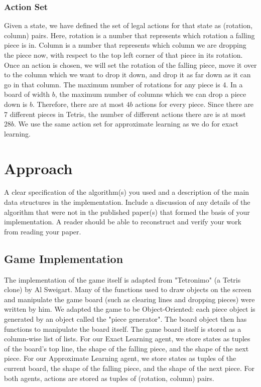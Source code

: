 \documentclass[11pt]{article}
\begin{document}
\subsubsection{Action Set}
Given a state, we have defined the set of legal actions for that state as (rotation, column) pairs. Here, rotation is a number that represents which rotation a falling piece is in. Column is a number that represents which column we are dropping the piece now, with respect to the top left corner of that piece in its rotation. Once an action is chosen, we will set the rotation of the falling piece, move it over to the column which we want to drop it down, and drop it as far down as it can go in that column. The maximum number of rotations for any piece is 4. In a board of width $b$, the maximum number of columns which we can drop a piece down is  $b$. Therefore, there are at most $4b$ actions for every piece. Since there are 7 different pieces in Tetris, the number of different actions there are is at most $28b$. We use the same action set for approximate learning as we do for exact learning.

\section{Approach}
A clear specification of the algorithm(s) you used and a description
of the main data structures in the implementation. Include a
discussion of any details of the algorithm that were not in the
published paper(s) that formed the basis of your implementation. A
reader should be able to reconstruct and verify your work from reading
your paper.

\subsection{Game Implementation}
The implementation of the game itself is adapted from "Tetronimo" (a Tetris clone) by Al Sweigart. Many of the functions used to draw objects on the screen and manipulate the game board (such as clearing lines and dropping pieces) were written by him. We adapted the game to be Object-Oriented: each piece object is generated by an object called the "piece generator". The board object then has functions to manipulate the board itself. The game board itself is stored as a column-wise list of lists. For our Exact Learning agent, we store states as tuples of the board's top line, the shape of the falling piece, and the shape of the next piece. For our Approximate Learning agent, we store states as tuples of the current board, the shape of the falling piece, and the shape of the next piece. For both agents, actions are stored as tuples of (rotation, column) pairs.
\end{document}
